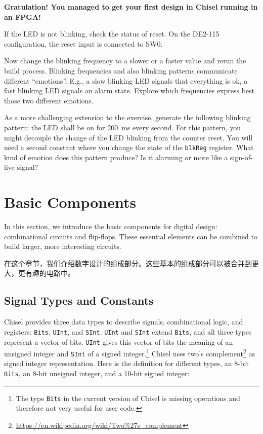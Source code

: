 \documentclass[%
    10pt,
    headinclude, footexclude,
    openright, %
    notitlepage,
    cleardoubleempty,
    headsepline,
    pointlessnumbers,
    bibtotoc, idxtotoc,
    ]{scrbook}
\newcommand{\code}[1]{{\small{\texttt{#1}}}}
\newcommand{\codefoot}[1]{{\footnotesize{\texttt{#1}}}}
\newcommand{\myref}[2]{\href{#1}{#2}}
\renewcommand{\myref}[2]{{#2}{\footnote{\url{#1}}}}
\begin{document}
{\bf Gratulation! You managed to get your first design in Chisel running in an FPGA!}

If the LED is not blinking, check the status of reset. On the DE2-115 configuration,
the reset input is connected to SW0.

Now change the blinking frequency to a slower or a faster value and
rerun the build process. Blinking frequencies and also blinking patterns
communicate different ``emotions''. E.g., a slow blinking LED signals that
everything is ok, a fast blinking LED signals an alarm state.
Explore which frequencies express best those two different emotions.

As a more challenging extension to the exercise, generate the following blinking pattern:
the LED shall be on for 200~ms every second. For this pattern, you might
decouple the change of the LED blinking from the counter reset.
You will need a second constant where you change the state of the
\code{blkReg} register. What kind of emotion does this pattern produce?
Is it alarming or more like a sign-of-live signal?




\chapter{Basic Components}

In this section, we introduce the basic components for digital design:
combinational circuits and flip-flops.
These essential elements can be combined to build larger, more interesting circuits.

在这个章节，我们介绍数字设计的组成部分。这些基本的组成部分可以被合并到更大，更有趣的电路中。

\section{Signal Types and Constants}

Chisel provides three data types to describe signals, combinational logic, and registers:
\code{Bits}, \code{UInt}, and \code{SInt}. \code{UInt} and \code{SInt} extend \code{Bits},
and all three types represent a vector of bits. \code{UInt} gives this vector of
bits the meaning of an unsigned integer and \code{SInt} of a signed
integer.\footnote{The type \codefoot{Bits} in the current version of Chisel is missing operations and
therefore not very useful for user code.}
Chisel uses \myref{https://en.wikipedia.org/wiki/Two\%27s\_complement}{two's complement}
as signed integer representation.
Here is the definition for different types, an 8-bit \code{Bits}, an 8-bit unsigned integer, and a 10-bit
signed integer:
\end{document}
